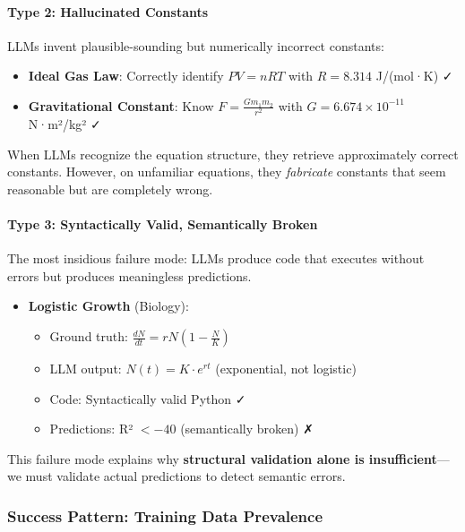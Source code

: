 \paragraph{Type 2: Hallucinated Constants}

LLMs invent plausible-sounding but numerically incorrect constants:

\begin{itemize}
    \item \textbf{Ideal Gas Law}: Correctly identify $PV = nRT$ with $R = 8.314$ J/(mol·K) ✓
    \item \textbf{Gravitational Constant}: Know $F = \frac{Gm_1m_2}{r^2}$ with $G = 6.674 \times 10^{-11}$ N·m²/kg² ✓
\end{itemize}

When LLMs recognize the equation structure, they retrieve approximately correct constants. However, on unfamiliar equations, they \emph{fabricate} constants that seem reasonable but are completely wrong.

\paragraph{Type 3: Syntactically Valid, Semantically Broken}

The most insidious failure mode: LLMs produce code that executes without errors but produces meaningless predictions.

\begin{itemize}
    \item \textbf{Logistic Growth} (Biology):
    \begin{itemize}
        \item Ground truth: $\frac{dN}{dt} = rN\left(1 - \frac{N}{K}\right)$
        \item LLM output: $N(t) = K \cdot e^{rt}$ (exponential, not logistic)
        \item Code: Syntactically valid Python ✓
        \item Predictions: R² $< -40$ (semantically broken) ✗
    \end{itemize}
\end{itemize}

This failure mode explains why \textbf{structural validation alone is insufficient}—we must validate actual predictions to detect semantic errors.

\subsubsection{Success Pattern: Training Data Prevalence}

